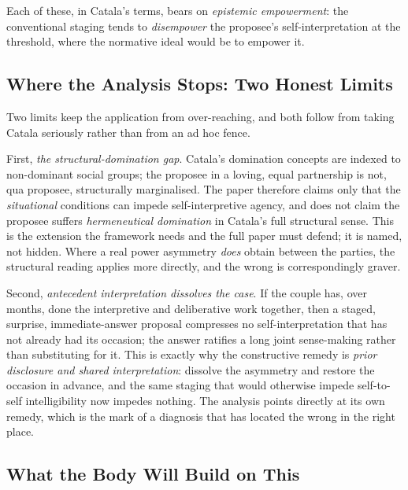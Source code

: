 Each of these, in Catala's terms, bears on \emph{epistemic empowerment}: the conventional staging tends to \emph{disempower} the proposee's self-interpretation at the threshold, where the normative ideal would be to empower it.

\subsection{Where the Analysis Stops: Two Honest Limits}\label{p06:sec:limits}

Two limits keep the application from over-reaching, and both follow from taking Catala seriously rather than from an ad hoc fence.

First, \emph{the structural-domination gap}. Catala's domination concepts are indexed to non-dominant social groups; the proposee in a loving, equal partnership is not, qua proposee, structurally marginalised. The paper therefore claims only that the \emph{situational} conditions can impede self-interpretive agency, and does not claim the proposee suffers \emph{hermeneutical domination} in Catala's full structural sense. This is the extension the framework needs and the full paper must defend; it is named, not hidden. Where a real power asymmetry \emph{does} obtain between the parties, the structural reading applies more directly, and the wrong is correspondingly graver.

Second, \emph{antecedent interpretation dissolves the case}. If the couple has, over months, done the interpretive and deliberative work together, then a staged, surprise, immediate-answer proposal compresses no self-interpretation that has not already had its occasion; the answer ratifies a long joint sense-making rather than substituting for it. This is exactly why the constructive remedy is \emph{prior disclosure and shared interpretation}: dissolve the asymmetry and restore the occasion in advance, and the same staging that would otherwise impede self-to-self intelligibility now impedes nothing. The analysis points directly at its own remedy, which is the mark of a diagnosis that has located the wrong in the right place.

\subsection{What the Body Will Build on This}

